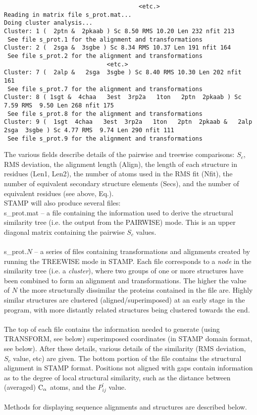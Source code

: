 \begin{scriptsize}
\begin{verbatim}
                                      <etc.>
Reading in matrix file s_prot.mat...
Doing cluster analysis...
Cluster: 1 (  2ptn &  2pkaab ) Sc 8.50 RMS 10.20 Len 232 nfit 213 
 See file s_prot.1 for the alignment and transformations
Cluster: 2 (  2sga &  3sgbe ) Sc 8.34 RMS 10.37 Len 191 nfit 164 
 See file s_prot.2 for the alignment and transformations
                             <etc.>    
Cluster: 7 (  2alp &   2sga  3sgbe ) Sc 8.40 RMS 10.30 Len 202 nfit 161 
 See file s_prot.7 for the alignment and transformations
Cluster: 8 ( 1sgt &  4chaa   3est  3rp2a   1ton   2ptn  2pkaab ) Sc 7.59 RMS  9.50 Len 268 nfit 175 
 See file s_prot.8 for the alignment and transformations
Cluster: 9 (  1sgt  4chaa   3est  3rp2a   1ton   2ptn  2pkaab &   2alp   2sga  3sgbe ) Sc 4.77 RMS  9.74 Len 290 nfit 111 
 See file s_prot.9 for the alignment and transformations
\end{verbatim} \end{scriptsize}

The various fields describe details of the pairwise and treewise
comparisons: $S_{c}$, RMS deviation, the alignment length (Align),
the length of each structure in residues (Len1, Len2), the number of
atoms used in the RMS fit (Nfit), the number of equivalent secondary
structure elements (Secs), and the number of equivalent residues
(see above, Eq.).\\

STAMP will also produce several files: \\

s\_prot.mat -- a file containing the information used to derive the 
structural similarity tree (i.e. the output from the PAIRWISE) mode.  This
is an upper diagonal matrix containing the pairwise $S_{c}$ values.\\
\\
s\_prot.$N$ -- a series of files containing transformations and alignments 
created by running the TREEWISE mode in STAMP.  Each file corresponds to 
a {\em node} in the similarity tree (i.e. a {\em cluster}), where two 
groups of one or more structures have been combined to form an
alignment and transformations.  The higher the value of $N$ the more 
structurally dissimilar the proteins contained in the file are.  Highly 
similar structures are clustered (aligned/superimposed) at an early stage 
in the program, with more distantly related structures being clustered 
towards the end.\\
\\
The top of each file contains the information needed to generate (using
TRANSFORM, see below)
superimposed coordinates (in STAMP domain format, see below). 
After these details, various details of the similarity (RMS deviation, 
$S_{c}$ value, etc) are given.  The bottom portion of the file contains 
the structural alignment in STAMP format.  Positions not aligned with 
gaps contain information as to the degree of local structural similarity, 
such as the distance between (averaged) ${\rm C}_{\alpha}$ atoms, and the 
$P_{ij}^{\prime}$ value.\\
\\
Methods for displaying sequence alignments and structures are described below.

